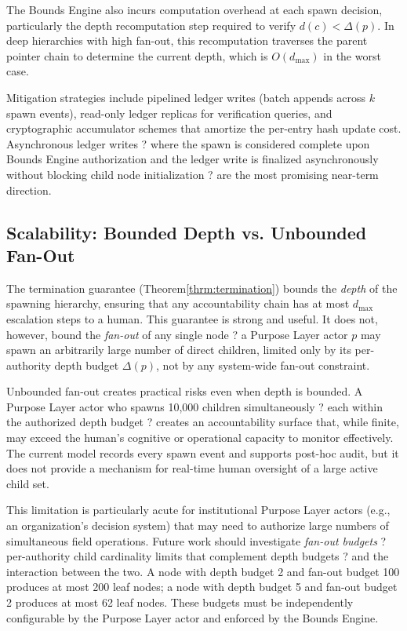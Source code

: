 The Bounds Engine also incurs computation overhead at each spawn decision, particularly the depth recomputation step required to verify $d(c) < \Delta(p)$. In deep hierarchies with high fan-out, this recomputation traverses the parent pointer chain to determine the current depth, which is $O(d_{\max})$ in the worst case.

Mitigation strategies include pipelined ledger writes (batch appends across $k$ spawn events), read-only ledger replicas for verification queries, and cryptographic accumulator schemes that amortize the per-entry hash update cost. Asynchronous ledger writes ? where the spawn is considered complete upon Bounds Engine authorization and the ledger write is finalized asynchronously without blocking child node initialization ? are the most promising near-term direction.

\subsection{Scalability: Bounded Depth vs. Unbounded Fan-Out}
\label{sec:lim-scalability}

The termination guarantee (Theorem\;\ref{thrm:termination}) bounds the \textit{depth} of the spawning hierarchy, ensuring that any accountability chain has at most $d_{\max}$ escalation steps to a human. This guarantee is strong and useful. It does not, however, bound the \textit{fan-out} of any single node ? a Purpose Layer actor $p$ may spawn an arbitrarily large number of direct children, limited only by its per-authority depth budget $\Delta(p)$, not by any system-wide fan-out constraint.

Unbounded fan-out creates practical risks even when depth is bounded. A Purpose Layer actor who spawns 10,000 children simultaneously ? each within the authorized depth budget ? creates an accountability surface that, while finite, may exceed the human's cognitive or operational capacity to monitor effectively. The current model records every spawn event and supports post-hoc audit, but it does not provide a mechanism for real-time human oversight of a large active child set.

This limitation is particularly acute for institutional Purpose Layer actors (e.g., an organization's decision system) that may need to authorize large numbers of simultaneous field operations. Future work should investigate \textit{fan-out budgets} ? per-authority child cardinality limits that complement depth budgets ? and the interaction between the two. A node with depth budget 2 and fan-out budget 100 produces at most 200 leaf nodes; a node with depth budget 5 and fan-out budget 2 produces at most 62 leaf nodes. These budgets must be independently configurable by the Purpose Layer actor and enforced by the Bounds Engine.

